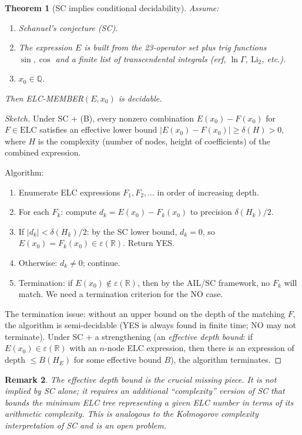 \documentclass[11pt]{article}
\newtheorem{theorem}{Theorem}
\newtheorem{remark}[theorem]{Remark}
\begin{document}
\begin{theorem}[SC implies conditional decidability]
\label{thm:sctocbd}
Assume:
\begin{enumerate}
  \item[(A)] Schanuel's conjecture (SC).
  \item[(B)] The expression $E$ is built from the 23-operator set plus trig functions $\sin,\cos$
    and a finite list of transcendental integrals (erf, $\ln\Gamma$, $\mathrm{Li}_2$, etc.).
  \item[(C)] $x_0\in\mathbb{Q}$.
\end{enumerate}
Then ELC-MEMBER$(E,x_0)$ is decidable.
\end{theorem}

\begin{proof}[Sketch]
Under SC + (B), every nonzero combination $E(x_0)-F(x_0)$ for $F\in\mathrm{ELC}$
satisfies an effective lower bound $|E(x_0)-F(x_0)|\geq \delta(H)>0$, where $H$
is the complexity (number of nodes, height of coefficients) of the combined expression.

Algorithm:
\begin{enumerate}
  \item Enumerate ELC expressions $F_1,F_2,\ldots$ in order of increasing depth.
  \item For each $F_k$: compute $d_k=E(x_0)-F_k(x_0)$ to precision $\delta(H_k)/2$.
  \item If $|d_k|<\delta(H_k)/2$: by the SC lower bound, $d_k=0$, so $E(x_0)=F_k(x_0)\in\varepsilon(\mathbb{R})$. Return YES.
  \item Otherwise: $d_k\neq0$; continue.
  \item Termination: if $E(x_0)\notin\varepsilon(\mathbb{R})$, then by the AIL/SC framework,
    no $F_k$ will match. We need a termination criterion for the NO case.
\end{enumerate}

The termination issue: without an upper bound on the depth of the matching $F$,
the algorithm is semi-decidable (YES is always found in finite time; NO may not terminate).
Under SC + a strengthening (an \emph{effective depth bound}: if $E(x_0)\in\varepsilon(\mathbb{R})$
with an $n$-node ELC expression, then there is an expression of depth $\leq B(H_E)$ for
some effective bound $B$), the algorithm terminates.
\end{proof}

\begin{remark}
The \emph{effective depth bound} is the crucial missing piece.
It is not implied by SC alone; it requires an additional ``complexity'' version of SC
that bounds the minimum ELC tree representing a given ELC number in terms of its
arithmetic complexity. This is analogous to the Kolmogorov complexity interpretation
of SC and is an open problem.
\end{remark}
\end{document}
